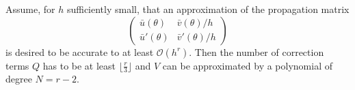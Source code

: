 \begin{theorem}\label{theorem:delta-formulae}
    Assume, for $h$ sufficiently small, that an approximation of the propagation matrix %
    $$
        \begin{pmatrix}
            \bar{u}(\theta)  & \bar{v}(\theta)/h  \\
            \bar{u}'(\theta) & \bar{v}'(\theta)/h
        \end{pmatrix}
    $$
    is desired to be accurate to at least $\mathcal{O}(h^r)$. %
    Then the number of correction terms $Q$ has to be at least $\lfloor\frac{r}{3} \rfloor$
    and $V$ can be approximated by a polynomial of degree $N=r-2$.

\end{theorem}
